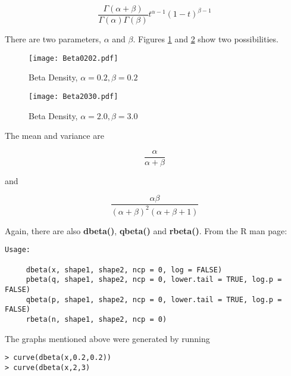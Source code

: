 \begin{equation}
\frac{\Gamma(\alpha+\beta)}{\Gamma(\alpha) \Gamma(\beta)}
t^{\alpha-1}(1-t)^{\beta-1}
\end{equation}

There are two parameters, $\alpha$ and $\beta$.  
Figures \ref{betadens0202}
and \ref{betadens2030}
show two possibilities.

\begin{figure}
\centerline{
\texttt{[image: Beta0202.pdf]}
}
\caption{Beta Density, $\alpha = 0.2, \beta = 0.2$}
\label{betadens0202}
\end{figure}

\begin{figure}
\centerline{
\texttt{[image: Beta2030.pdf]}
}
\caption{Beta Density, $\alpha = 2.0, \beta = 3.0$}
\label{betadens2030}
\end{figure}

% 
% 

The mean and variance are

\begin{equation}
\frac{\alpha}{\alpha+\beta}
\end{equation}

and

\begin{equation}
\frac
{\alpha \beta}
{(\alpha+\beta)^2 (\alpha+\beta+1)}
\end{equation}

Again, there are also {\bf dbeta()}, {\bf qbeta()} and {\bf rbeta()}.
From the R man page:

\begin{lstlisting}
Usage:

     dbeta(x, shape1, shape2, ncp = 0, log = FALSE)
     pbeta(q, shape1, shape2, ncp = 0, lower.tail = TRUE, log.p = FALSE)
     qbeta(p, shape1, shape2, ncp = 0, lower.tail = TRUE, log.p = FALSE)
     rbeta(n, shape1, shape2, ncp = 0)
\end{lstlisting}

The graphs mentioned above were generated by running

\begin{lstlisting}
> curve(dbeta(x,0.2,0.2))
> curve(dbeta(x,2,3)
\end{lstlisting}


